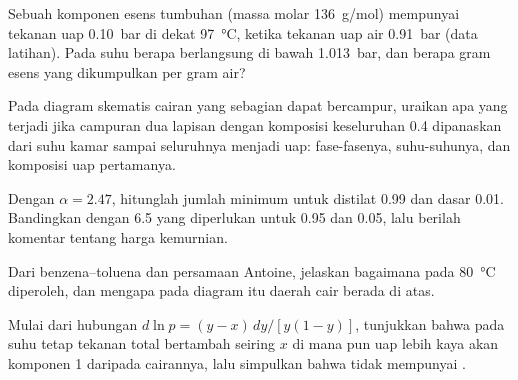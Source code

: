 \begin{exercise}[$\star\star$]\label{exo:b2:liquid-vapour-diagrams:8}
Sebuah komponen esens tumbuhan (massa molar \qty{136}{g/mol}) mempunyai
tekanan uap \qty{0.10}{bar} di dekat \qty{97}{\degreeCelsius}, ketika
tekanan uap air \qty{0.91}{bar} (data latihan). Pada suhu berapa  berlangsung di bawah \qty{1.013}{bar}, dan berapa gram esens yang
dikumpulkan per gram air?
\end{exercise}

\begin{exercise}[$\star\star$]\label{exo:b2:liquid-vapour-diagrams:9}
Pada diagram skematis cairan yang sebagian dapat bercampur, uraikan apa
yang terjadi jika campuran dua lapisan dengan komposisi keseluruhan 0.4
dipanaskan dari suhu kamar sampai seluruhnya menjadi uap: fase-fasenya,
suhu-suhunya, dan komposisi uap pertamanya.
\end{exercise}

\begin{exercise}[$\star\star\star$]\label{exo:b2:liquid-vapour-diagrams:10}
Dengan $\alpha = 2.47$, hitunglah jumlah minimum  untuk
distilat 0.99 dan dasar 0.01. Bandingkan dengan 6.5 yang diperlukan untuk
0.95 dan 0.05, lalu berilah komentar tentang harga kemurnian.
\end{exercise}

\begin{exercise}[$\star\star\star$]\label{exo:b2:liquid-vapour-diagrams:11}
Dari  benzena--toluena dan persamaan Antoine, jelaskan
bagaimana  pada \qty{80}{\degreeCelsius} diperoleh, dan
mengapa pada diagram itu daerah cair berada di atas.
\end{exercise}

\begin{exercise}[$\star\star\star$]\label{exo:b2:liquid-vapour-diagrams:12}
Mulai dari hubungan $d\ln p = (y - x)\,dy/[y(1 - y)]$, tunjukkan bahwa pada
suhu tetap tekanan total bertambah seiring $x$ di mana pun uap lebih kaya
akan komponen 1 daripada cairannya, lalu simpulkan bahwa 
tidak mempunyai .
\end{exercise}

